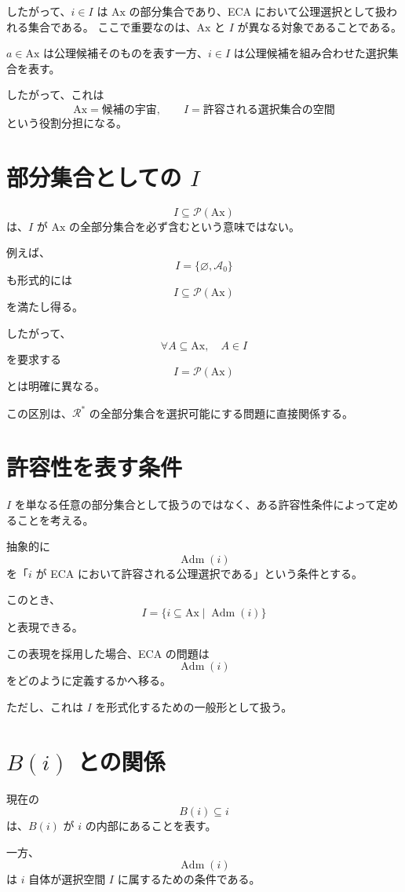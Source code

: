 \documentclass[a4paper,11pt]{article}
\newcommand{\Ax}{\mathrm{Ax}}
\begin{document}
したがって、$i\in I$ は $\Ax$ の部分集合であり、ECA において公理選択として扱われる集合である。
ここで重要なのは、$\Ax$ と $I$ が異なる対象であることである。

$a\in\Ax$ は公理候補そのものを表す一方、$i\in I$ は公理候補を組み合わせた選択集合を表す。

したがって、これは
\[
\Ax=\text{候補の宇宙},
\qquad
I=\text{許容される選択集合の空間}
\]
という役割分担になる。

\section{部分集合としての $I$}

\[
I\subseteq\mathcal{P}(\Ax)
\]
は、$I$ が $\Ax$ の全部分集合を必ず含むという意味ではない。

例えば、
\[
I=\{\varnothing,\mathcal{A}_0\}
\]
も形式的には
\[
I\subseteq\mathcal{P}(\Ax)
\]
を満たし得る。

したがって、
\[
\forall A\subseteq\Ax,\quad A\in I
\]
を要求する
\[
I=\mathcal{P}(\Ax)
\]
とは明確に異なる。

この区別は、$\mathcal{R}^*$ の全部分集合を選択可能にする問題に直接関係する。

\section{許容性を表す条件}

$I$ を単なる任意の部分集合として扱うのではなく、ある許容性条件によって定めることを考える。

抽象的に
\[
\operatorname{Adm}(i)
\]
を「$i$ が ECA において許容される公理選択である」という条件とする。

このとき、
\[
\boxed{
I=\{i\subseteq\Ax\mid\operatorname{Adm}(i)\}
}
\]
と表現できる。

この表現を採用した場合、ECA の問題は
\[
\operatorname{Adm}(i)
\]
をどのように定義するかへ移る。

ただし、これは $I$ を形式化するための一般形として扱う。

\section{$B(i)$ との関係}

現在の
\[
B(i)\subseteq i
\]
は、$B(i)$ が $i$ の内部にあることを表す。

一方、
\[
\operatorname{Adm}(i)
\]
は $i$ 自体が選択空間 $I$ に属するための条件である。
\end{document}
